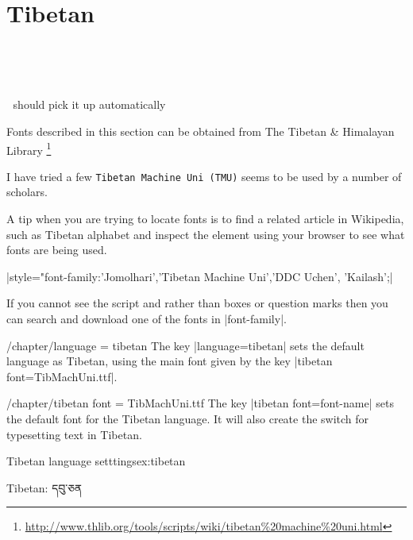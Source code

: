 \section{Tibetan}

^^A\newfontfamily{}

^^A\newfontfamily{}

^^A should pick it up automatically \tibetan

Fonts described in this section can be obtained from The Tibetan \& Himalayan Library
\footnote{\url{http://www.thlib.org/tools/scripts/wiki/tibetan\%20machine\%20uni.html}  }

I have tried a few \texttt{Tibetan Machine Uni (TMU)} seems to be used by a number of scholars. 

A tip when you are trying to locate fonts is to find a related article in Wikipedia, such as Tibetan alphabet and inspect the element using your browser to see what fonts are being used.


|style="font-family:'Jomolhari','Tibetan Machine Uni','DDC Uchen', 'Kailash';| 


If you cannot see the script and rather than boxes or question marks then you can search and download one of the fonts in |font-family|.

\def\tibetandefaultfont#1{\newfontfamily\tibetan[Language=Tibetan]{#1}}

\cxset{tibetan font/.code=\tibetandefaultfont{#1}}






\begin{key}{/chapter/language = tibetan} The key |language=tibetan| sets the default language as Tibetan, using the main font given by the key |tibetan font=TibMachUni.ttf|.
\end{key}

\begin{key}{/chapter/tibetan font = TibMachUni.ttf} The key |tibetan font=font-name| sets the default font for the Tibetan language. It will also create the switch \cmd{\tibetan} for typesetting text in Tibetan.
\end{key}

\begin{texexample}{Tibetan language setttings}{ex:tibetan}
\tibetan

\tibetan Tibetan: དབུ་ཅན
\end{texexample}


